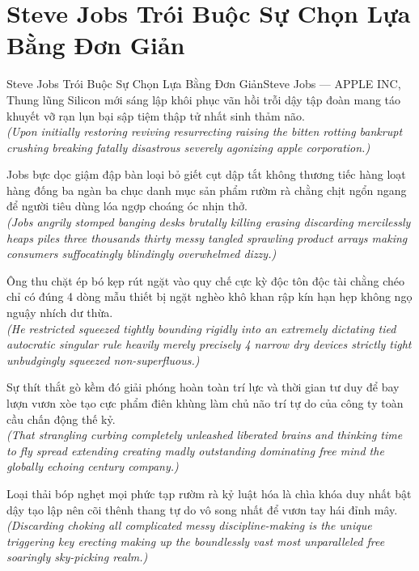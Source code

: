 \section{Steve Jobs Trói Buộc Sự Chọn Lựa Bằng Đơn Giản}
\begin{truyen}{Steve Jobs Trói Buộc Sự Chọn Lựa Bằng Đơn Giản}{Steve Jobs --- APPLE INC, Thung lũng Silicon}
 mới sáng lập khôi phục vãn hồi trỗi dậy tập đoàn mang táo khuyết vỡ rạn lụn bại sập tiệm thập tử nhất sinh thảm não.\\[4pt]
\textit{(Upon initially restoring reviving resurrecting raising the bitten rotting bankrupt crushing breaking fatally disastrous severely agonizing apple corporation.)}

Jobs bực dọc giậm đập bàn loại bỏ giết cụt dập tắt không thương tiếc hàng loạt hàng đống ba ngàn ba chục danh mục sản phẩm rườm rà chằng chịt ngổn ngang để người tiêu dùng lóa ngợp choáng óc nhịn thở.\\[4pt]
\textit{(Jobs angrily stomped banging desks brutally killing erasing discarding mercilessly heaps piles three thousands thirty messy tangled sprawling product arrays making consumers suffocatingly blindingly overwhelmed dizzy.)}

Ông thu chặt ép bó kẹp rút ngặt vào quy chế cực kỳ độc tôn độc tài chằng chéo chỉ có đúng 4 dòng mẫu thiết bị ngặt nghèo khô khan rập kín hạn hẹp không ngọ nguậy nhích dư thừa.\\[4pt]
\textit{(He restricted squeezed tightly bounding rigidly into an extremely dictating tied autocratic singular rule heavily merely precisely 4 narrow dry devices strictly tight unbudgingly squeezed non-superfluous.)}

Sự thít thắt gò kềm đó giải phóng hoàn toàn trí lực và thời gian tư duy để bay lượn vươn xòe tạo cực phẩm điên khùng làm chủ não trí tự do của công ty toàn cầu chấn động thế kỷ.\\[4pt]
\textit{(That strangling curbing completely unleashed liberated brains and thinking time to fly spread extending creating madly outstanding dominating free mind the globally echoing century company.)}

\end{truyen}
\begin{baihoc}
  Loại thải bóp nghẹt mọi phức tạp rườm rà kỷ luật hóa là chìa khóa duy nhất bật dậy tạo lập nên cõi thênh thang tự do vô song nhất để vươn tay hái đỉnh mây.\\[4pt]
  \textit{(Discarding choking all complicated messy discipline-making is the unique triggering key erecting making up the boundlessly vast most unparalleled free soaringly sky-picking realm.)}
\end{baihoc}

